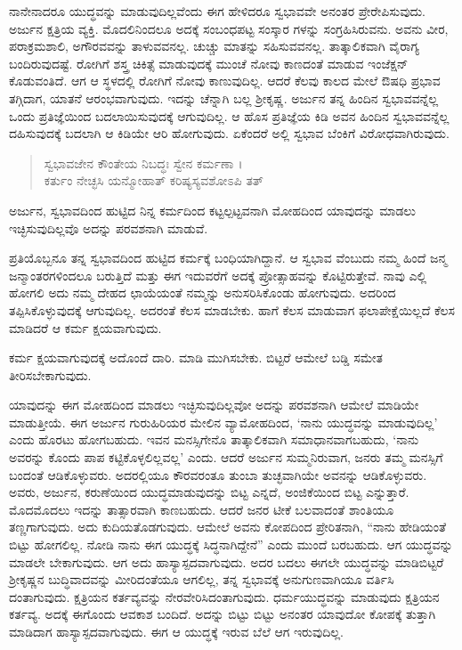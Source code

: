 ನಾನೇನಾದರೂ ಯುದ್ಧವನ್ನು ಮಾಡುವುದಿಲ್ಲವೆಂದು ಈಗ ಹೇಳಿದರೂ ಸ್ವಭಾವವೇ ಅನಂತರ ಪ್ರೇರೇಪಿಸುವುದು. ಅರ್ಜುನ ಕ್ಷತ್ರಿಯ ವ್ಯಕ್ತಿ. ಮೊದಲಿನಿಂದಲೂ ಅದಕ್ಕೆ ಸಂಬಂಧಪಟ್ಟ ಸಂಸ್ಕಾರ ಗಳನ್ನು ಸಂಗ್ರಹಿಸಿರುವನು. ಅವನು ವೀರ, ಪರಾಕ್ರಮಶಾಲಿ, ಅಗೌರವವನ್ನು ತಾಳುವವನಲ್ಲ. ಚುಚ್ಚು ಮಾತನ್ನು ಸಹಿಸುವವನಲ್ಲ. ತಾತ್ಕಾಲಿಕವಾಗಿ ವೈರಾಗ್ಯ ಬಂದಿರುವುದಷ್ಟೆ. ರೋಗಿಗೆ ಶಸ್ತ್ರ ಚಿಕಿತ್ಸೆ ಮಾಡುವುದಕ್ಕೆ ಮುಂಚೆ ನೋವು ಕಾಣದಂತೆ ಮಾಡುವ ಇಂಜೆಕ್ಷನ್ ಕೊಡುವಂತಿದೆ. ಆಗ ಆ ಸ್ಥಳದಲ್ಲಿ ರೋಗಿಗೆ ನೋವು ಕಾಣುವುದಿಲ್ಲ. ಆದರೆ ಕೆಲವು ಕಾಲದ ಮೇಲೆ ಔಷಧಿ ಪ್ರಭಾವ ತಗ್ಗಿದಾಗ, ಯಾತನೆ ಆರಂಭವಾಗುವುದು. ಇದನ್ನು ಚೆನ್ನಾಗಿ ಬಲ್ಲ ಶ್ರೀಕೃಷ್ಣ. ಅರ್ಜುನ ತನ್ನ ಹಿಂದಿನ ಸ್ವಭಾವವನ್ನೆಲ್ಲ ಒಂದು ಪ್ರತಿಜ್ಞೆಯಿಂದ ಬದಲಾಯಿಸುವುದಕ್ಕೆ ಆಗುವುದಿಲ್ಲ. ಆ ಹೊಸ ಪ್ರತಿಜ್ಞೆಯ ಕಿಡಿ ಅವನ ಹಿಂದಿನ ಸ್ವಭಾವವನ್ನೆಲ್ಲ ದಹಿಸುವುದಕ್ಕೆ ಬದಲಾಗಿ ಆ ಕಿಡಿಯೇ ಆರಿ ಹೋಗುವುದು. ಏಕೆಂದರೆ ಅಲ್ಲಿ ಸ್ವಭಾವ ಬೆಂಕಿಗೆ ವಿರೋಧವಾಗಿರುವುದು.

\begin{verse}
ಸ್ವಭಾವಜೇನ ಕೌಂತೇಯ ನಿಬದ್ಧಃ ಸ್ವೇನ ಕರ್ಮಣಾ ।\\ಕರ್ತುಂ ನೇಚ್ಛಸಿ ಯನ್ಮೋಹಾತ್ ಕರಿಷ್ಯಸ್ಯವಶೋಽಪಿ ತತ್ 
\end{verse}

{\small ಅರ್ಜುನ, ಸ್ವಭಾವದಿಂದ ಹುಟ್ಟಿದ ನಿನ್ನ ಕರ್ಮದಿಂದ ಕಟ್ಟಲ್ಪಟ್ಟವನಾಗಿ ಮೋಹದಿಂದ ಯಾವುದನ್ನು ಮಾಡಲು ಇಚ್ಛಿಸುವುದಿಲ್ಲವೊ ಅದನ್ನು ಪರವಶನಾಗಿ ಮಾಡುವೆ.}

ಪ್ರತಿಯೊಬ್ಬನೂ ತನ್ನ ಸ್ವಭಾವದಿಂದ ಹುಟ್ಟಿದ ಕರ್ಮಕ್ಕೆ ಬಂಧಿಯಾಗಿದ್ದಾನೆ. ಆ ಸ್ವಭಾವ ವೆಂಬುದು ನಮ್ಮ ಹಿಂದೆ ಜನ್ಮ ಜನ್ಮಾಂತರಗಳಿಂದಲೂ ಬರುತ್ತಿದೆ ಮತ್ತು ಈಗ ಇದುವರೆಗೆ ಅದಕ್ಕೆ ಪ್ರೋತ್ಸಾಹವನ್ನು ಕೊಟ್ಟಿರುತ್ತೇವೆ. ನಾವು ಎಲ್ಲಿ ಹೋಗಲಿ ಅದು ನಮ್ಮ ದೇಹದ ಛಾಯೆಯಂತೆ ನಮ್ಮನ್ನು ಅನುಸರಿಸಿಕೊಂಡು ಹೋಗುವುದು. ಅದರಿಂದ ತಪ್ಪಿಸಿಕೊಳ್ಳುವುದಕ್ಕೆ ಆಗುವುದಿಲ್ಲ. ಅದರಂತೆ ಕೆಲಸ ಮಾಡಬೇಕು. ಹಾಗೆ ಕೆಲಸ ಮಾಡುವಾಗ ಫಲಾಪೇಕ್ಷೆಯಿಲ್ಲದೆ ಕೆಲಸ ಮಾಡಿದರೆ ಆ ಕರ್ಮ ಕ್ಷಯವಾಗುವುದು.

ಕರ್ಮ ಕ್ಷಯವಾಗುವುದಕ್ಕೆ ಅದೊಂದೆ ದಾರಿ. ಮಾಡಿ ಮುಗಿಸಬೇಕು. ಬಿಟ್ಟರೆ ಆಮೇಲೆ ಬಡ್ಡಿ ಸಮೇತ ತೀರಿಸಬೇಕಾಗುವುದು.

ಯಾವುದನ್ನು ಈಗ ಮೋಹದಿಂದ ಮಾಡಲು ಇಚ್ಛಿಸುವುದಿಲ್ಲವೋ ಅದನ್ನು ಪರವಶನಾಗಿ ಆಮೇಲೆ ಮಾಡಿಯೇ ಮಾಡುತ್ತೀಯೆ. ಈಗ ಅರ್ಜುನ ಗುರುಹಿರಿಯರ ಮೇಲಿನ ವ್ಯಾಮೋಹದಿಂದ, ‘ನಾನು ಯುದ್ಧವನ್ನು ಮಾಡುವುದಿಲ್ಲ’ ಎಂದು ಹೊರಟು ಹೋಗಬಹುದು. ಇವನ ಮನಸ್ಸಿಗೇನೊ ತಾತ್ಕಾಲಿಕವಾಗಿ ಸಮಾಧಾನವಾಗಬಹುದು, ‘ನಾನು ಅವರನ್ನು ಕೊಂದು ಪಾಪ ಕಟ್ಟಿಕೊಳ್ಳಲಿಲ್ಲವಲ್ಲ’ ಎಂದು. ಆದರೆ ಅರ್ಜುನ ಸುಮ್ಮನಿರುವಾಗ, ಜನರು ತಮ್ಮ ಮನಸ್ಸಿಗೆ ಬಂದಂತೆ ಆಡಿಕೊಳ್ಳುವರು. ಅದರಲ್ಲಿಯೂ ಕೌರವರಂತೂ ತುಂಬಾ ತುಚ್ಛವಾಗಿಯೇ ಅವನನ್ನು ಆಡಿಕೊಳ್ಳುವರು. ಅವರು, ಅರ್ಜುನ, ಕರುಣೆಯಿಂದ ಯುದ್ಧಮಾಡುವುದನ್ನು ಬಿಟ್ಟ ಎನ್ನದೆ, ಅಂಜಿಕೆಯಿಂದ ಬಿಟ್ಟ ಎನ್ನುತ್ತಾರೆ. ಮೊದಮೊದಲು ಇದನ್ನು ತಾತ್ಸಾರವಾಗಿ ಕಾಣಬಹುದು. ಆದರೆ ಜನರ ಟೀಕೆ ಬಲವಾದಂತೆ ಶಾಂತಿಯೂ ತಣ್ಣಗಾಗುವುದು. ಅದು ಕುದಿಯತೊಡಗುವುದು. ಆಮೇಲೆ ಅವನು ಕೋಪದಿಂದ ಪ್ರೇರಿತನಾಗಿ, “ನಾನು ಹೇಡಿಯಂತೆ ಬಿಟ್ಟು ಹೋಗಲಿಲ್ಲ. ನೋಡಿ ನಾನು ಈಗ ಯುದ್ಧಕ್ಕೆ ಸಿದ್ಧನಾಗಿದ್ದೇನೆ” ಎಂದು ಮುಂದೆ ಬರಬಹುದು. ಆಗ ಯುದ್ಧವನ್ನು ಮಾಡಲೇ ಬೇಕಾಗುವುದು. ಆಗ ಅದು ಹಾಸ್ಯಾಸ್ಪದವಾಗುವುದು. ಅದರ ಬದಲು ಈಗಲೇ ಯುದ್ಧವನ್ನು ಮಾಡಿಬಿಟ್ಟರೆ ಶ್ರೀಕೃಷ್ಣನ ಬುದ್ಧಿವಾದವನ್ನು ಮೀರಿದಂತೆಯೂ ಆಗಲಿಲ್ಲ, ತನ್ನ ಸ್ವಭಾವಕ್ಕೆ ಅನುಗುಣವಾಗಿಯೂ ವರ್ತಿಸಿ ದಂತಾಗುವುದು. ಕ್ಷತ್ರಿಯನ ಕರ್ತವ್ಯವನ್ನು ನೇರವೇರಿಸಿದಂತಾಗುವುದು. ಧರ್ಮಯುದ್ಧವನ್ನು ಮಾಡುವುದು ಕ್ಷತ್ರಿಯನ ಕರ್ತವ್ಯ. ಅದಕ್ಕೆ ಈಗೊಂದು ಆವಕಾಶ ಬಂದಿದೆ. ಅದನ್ನು ಬಿಟ್ಟು ಬಿಟ್ಟು ಅನಂತರ ಯಾವುದೋ ಕೋಪಕ್ಕೆ ತುತ್ತಾಗಿ ಮಾಡಿದಾಗ ಹಾಸ್ಯಾಸ್ಪದವಾಗುವುದು. ಈಗ ಆ ಯುದ್ಧಕ್ಕೆ ಇರುವ ಬೆಲೆ ಆಗ ಇರುವುದಿಲ್ಲ.

